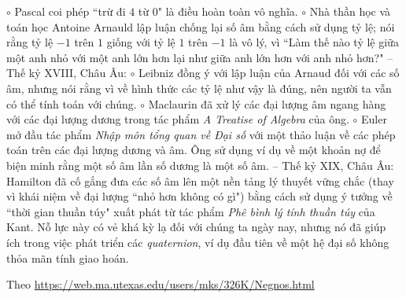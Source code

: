 \begin{multicols}{2}
	\vskip 0.1cm
	$\circ$ Pascal coi phép ``trừ đi $4$ từ 0" là điều hoàn toàn vô nghĩa.
	\vskip 0.1cm
	$\circ$ Nhà thần học và toán học Antoine Arnauld lập luận chống lại số âm bằng cách sử dụng tỷ lệ; nói rằng tỷ lệ $-1$ trên $1$ giống với tỷ lệ $1$ trên $-1$ là vô lý, vì ``Làm thế nào tỷ lệ giữa một anh nhỏ với một anh lớn hơn lại như giữa anh lớn hơn với anh nhỏ hơn?"
	\vskip 0.1cm
	-- Thế kỷ XVIII, Châu Âu:
	\vskip 0.1cm
	$\circ$ Leibniz đồng ý với lập luận của Arnaud đối với các số âm, nhưng nói rằng vì về hình thức các tỷ lệ như vậy là đúng, nên người ta vẫn có thể tính toán với chúng.
	\vskip 0.1cm
	$\circ$ Maclaurin đã xử lý các đại lượng âm ngang hàng với các đại lượng dương trong tác phẩm \textit{A Treatise of Algebra} của ông.
	\vskip 0.1cm 
	$\circ$ Euler mở đầu tác phẩm \textit{Nhập môn tổng quan về Đại số} với một thảo luận về các phép toán trên các đại lượng dương và âm. Ông sử dụng ví dụ về một khoản nợ để biện minh rằng một số âm lần số dương là một số âm.  
	\vskip 0.1cm
	-- Thế kỷ XIX, Châu Âu: Hamilton đã cố gắng đưa các số âm lên một nền tảng lý thuyết vững chắc (thay vì khái niệm về đại lượng ``nhỏ hơn không có gì") bằng cách sử dụng ý tưởng về ``thời gian thuần túy" xuất phát từ tác phẩm \textit{Phê bình lý tính thuần túy} của Kant. Nỗ lực này có vẻ khá kỳ lạ đối với chúng ta ngày nay, nhưng nó đã giúp ích trong việc phát triển các \textit{quaternion}, ví dụ đầu tiên về một hệ đại số không thỏa mãn tính giao hoán.
	\begin{flushright}
		Theo \url{https://web.ma.utexas.edu/users/mks/326K/Negnos.html}
	\end{flushright}
\end{multicols}